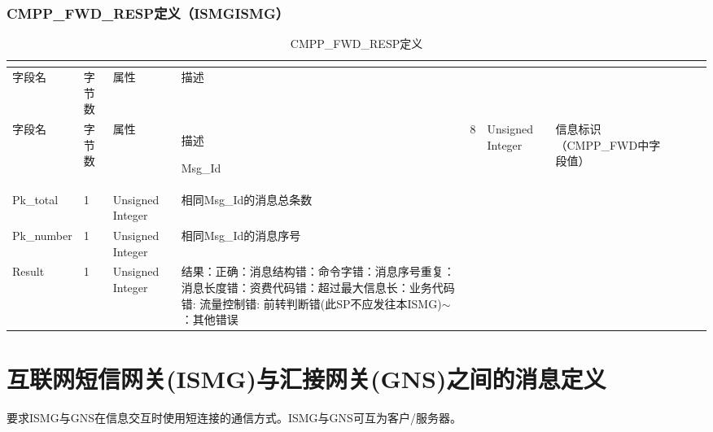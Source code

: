 \documentclass[11pt]{book} %
\begin{document}
\subsubsection{CMPP\_FWD\_RESP定义（ISMG\textrightarrow ISMG）}




\begin{longtable}{|m{90pt}|m{35pt}|m{80pt}|m{200pt}|}
\tabularnewline\hline
字段名&字节数&属性&描述
\endhead

\caption{CMPP\_FWD\_RESP定义}\\
\hline
字段名&字节数&属性&描述
\endfirsthead

\endfoot

\endlastfoot

\hline
Msg\_Id&8&Unsigned Integer&信息标识（CMPP\_FWD中字段值）\\
\hline
Pk\_total&1&Unsigned Integer&相同Msg\_Id的消息总条数\\
\hline
Pk\_number&1&Unsigned Integer&相同Msg\_Id的消息序号\\
\hline
Result&1&Unsigned Integer&结果：正确：消息结构错：命令字错：消息序号重复：消息长度错：资费代码错：超过最大信息长：业务代码错: 流量控制错: 前转判断错(此SP不应发往本ISMG)$\sim$ ：其他错误\\
\hline
\end{longtable}






\section{互联网短信网关(ISMG)与汇接网关(GNS)之间的消息定义}

要求ISMG与GNS在信息交互时使用短连接的通信方式。ISMG与GNS可互为客户/服务器。

%
%
%
%
%
\end{document}
